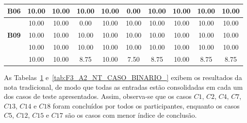 \begin{table}[htbp]
\begin{tabular}{c|ccccccccc|}
		\multicolumn{1}{|c|}{\textbf{B06}} & \multicolumn{1}{c|}{10.00} & \multicolumn{1}{c|}{10.00} & \multicolumn{1}{c|}{10.00} & \multicolumn{1}{c|}{10.00} & \multicolumn{1}{c|}{0.00} & \multicolumn{1}{c|}{10.00} & \multicolumn{1}{c|}{10.00} & \multicolumn{1}{c|}{10.00} & 10.00 \\ \hline
		\rowcolor[HTML]{F2F2F2} 
		\multicolumn{1}{|c|}{\cellcolor[HTML]{F2F2F2}\textbf{B08}} & \multicolumn{1}{c|}{\cellcolor[HTML]{F2F2F2}10.00} & \multicolumn{1}{c|}{\cellcolor[HTML]{F2F2F2}10.00} & \multicolumn{1}{c|}{\cellcolor[HTML]{F2F2F2}0.00} & \multicolumn{1}{c|}{\cellcolor[HTML]{F2F2F2}10.00} & \multicolumn{1}{c|}{\cellcolor[HTML]{F2F2F2}10.00} & \multicolumn{1}{c|}{\cellcolor[HTML]{F2F2F2}10.00} & \multicolumn{1}{c|}{\cellcolor[HTML]{F2F2F2}10.00} & \multicolumn{1}{c|}{\cellcolor[HTML]{F2F2F2}10.00} & 10.00 \\ \hline
		\multicolumn{1}{|c|}{\textbf{B09}} & \multicolumn{1}{c|}{10.00} & \multicolumn{1}{c|}{10.00} & \multicolumn{1}{c|}{10.00} & \multicolumn{1}{c|}{10.00} & \multicolumn{1}{c|}{10.00} & \multicolumn{1}{c|}{10.00} & \multicolumn{1}{c|}{10.00} & \multicolumn{1}{c|}{10.00} & 10.00 \\ \hline
		\rowcolor[HTML]{F2F2F2} 
		\multicolumn{1}{|c|}{\cellcolor[HTML]{F2F2F2}\textbf{B10}} & \multicolumn{1}{c|}{\cellcolor[HTML]{F2F2F2}10.00} & \multicolumn{1}{c|}{\cellcolor[HTML]{F2F2F2}10.00} & \multicolumn{1}{c|}{\cellcolor[HTML]{F2F2F2}10.00} & \multicolumn{1}{c|}{\cellcolor[HTML]{F2F2F2}10.00} & \multicolumn{1}{c|}{\cellcolor[HTML]{F2F2F2}10.00} & \multicolumn{1}{c|}{\cellcolor[HTML]{F2F2F2}10.00} & \multicolumn{1}{c|}{\cellcolor[HTML]{F2F2F2}10.00} & \multicolumn{1}{c|}{\cellcolor[HTML]{F2F2F2}10.00} & 10.00 \\ \hline
		\rowcolor[HTML]{D0CECE} 
		\multicolumn{1}{|c|}{\cellcolor[HTML]{D0CECE}\textbf{Média}} & \multicolumn{1}{c|}{\cellcolor[HTML]{D0CECE}10.00} & \multicolumn{1}{c|}{\cellcolor[HTML]{D0CECE}10.00} & \multicolumn{1}{c|}{\cellcolor[HTML]{D0CECE}8.75} & \multicolumn{1}{c|}{\cellcolor[HTML]{D0CECE}10.00} & \multicolumn{1}{c|}{\cellcolor[HTML]{D0CECE}7.50} & \multicolumn{1}{c|}{\cellcolor[HTML]{D0CECE}8.75} & \multicolumn{1}{c|}{\cellcolor[HTML]{D0CECE}10.00} & \multicolumn{1}{c|}{\cellcolor[HTML]{D0CECE}8.75} & 8.75 \\ \hline
	\end{tabular}
	\label{tab:F3_A2_NT_CASO_BINARIO}
\end{table}

As Tabelas~\ref{tab:F3_A2_NT_CASO_BINARIO} e~\ref{tab:F3_A2_NT_CASO_BINARIO_} exibem os resultados da nota tradicional, de modo que todas as entradas estão consolidadas em cada um dos casos de teste apresentados. Assim, observa-se que os casos $C1$, $C2$, $C4$, $C7$, $C13$, $C14$ e $C18$ foram concluídos por todos os participantes, enquanto os casos $C5$, $C12$, $C15$ e $C17$ são os casos com menor índice de conclusão.

